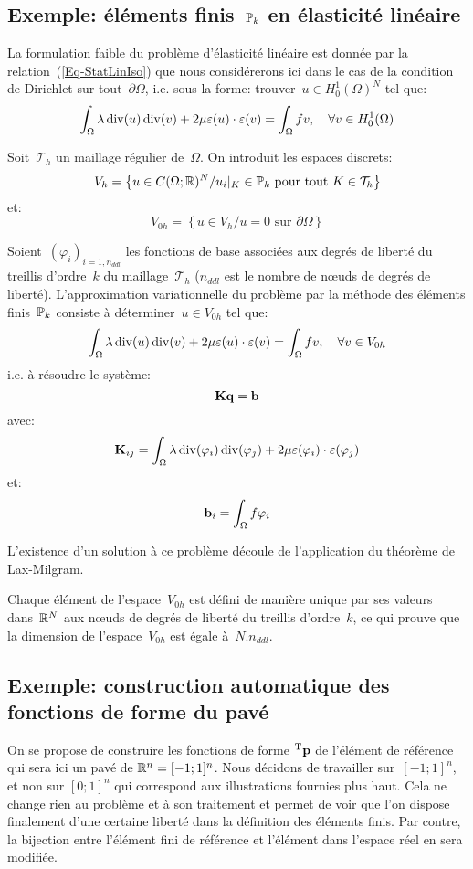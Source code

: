 \medskip
\subsection{Exemple: éléments finis~$\mathbb P_k$ en élasticité linéaire}

La formulation faible du problème d'élasticité linéaire est donnée par la relation~(\ref{Eq-StatLinIso}) que nous considérerons ici dans le cas de la condition de Dirichlet sur tout~$\partial\Omega$, i.e. sous la forme: trouver~$u\in H^1_0(\Omega)^N$ tel que:
\[
\displaystyle\int_\Omega \lambda \operatorname{div}(u)\operatorname{div}(v)+2\mu\varepsilon(u)\cdot\varepsilon(v) = \displaystyle\int_\Omega fv, \quad \forall v\in H^1_0(\Omega)
\]

Soit~$\mathcal{T}_h$ un maillage régulier de~$\Omega$. On introduit les espaces discrets:
\[ V_h=\left\{ u\in C(\Omega;\mathbb R)^N/ u_i|_K\in\mathbb P_k \text{ pour tout }K\in\mathcal{T}_h \right\} \]
et:
\[ V_{0h} = \left\{ u\in V_h/ u=0 \text{ sur }\partial\Omega\right\} \]

Soient~$(\varphi_i)_{i=1,n_{ddl}}$ les fonctions de base associées aux degrés de liberté du treillis d'ordre~$k$ du maillage~$\mathcal{T}_h$ ($n_{ddl}$ est le nombre de nœuds de degrés de liberté). L'approximation variationnelle du problème par la méthode des éléments finis~$\mathbb P_k$ consiste à déterminer~$u\in V_{0h}$ tel que:
\[
\displaystyle\int_\Omega \lambda \operatorname{div}(u)\operatorname{div}(v)+2\mu\varepsilon(u)\cdot\varepsilon(v) = \displaystyle\int_\Omega fv, \quad \forall v\in V_{0h}
\]
i.e. à résoudre le système:
\[ \MM{K}\VV{q}=\VV{b} \]
avec:
\[ \MM{K}_{ij} = \dint_\Omega \lambda \dive(\varphi_i)\dive(\varphi_j)+2\mu\varepsilon(\varphi_i)\cdot\varepsilon(\varphi_j) \]
et:
\[ \VV{b}_i = \dint_\Omega f\varphi_i \]

L'existence d'un solution à ce problème découle de l'application du théorème de Lax-Milgram.

Chaque élément de l'espace~$V_{0h}$ est défini de manière unique par ses valeurs dans~$\mathbb R^N$ aux nœuds de degrés de liberté du treillis d'ordre~$k$, ce qui prouve que la dimension de l'espace~$V_{0h}$ est égale à~$N.n_{ddl}$.

\medskip
\subsection{Exemple: construction automatique des fonctions de forme du pavé}

On se propose de construire les fonctions de forme ${}^\mathrm{T}\mathbf{p}$ de l'élément de référence qui sera ici un pavé de $\mathbb R^n=[-1;1]^n$.
Nous décidons de travailler sur~$[-1;1]^n$, et non sur $[0;1]^n$ qui correspond aux illustrations fournies plus haut. Cela ne change rien au problème et à son traitement et permet de voir que l'on dispose finalement d'une certaine liberté dans la définition des éléments finis. Par contre, la bijection entre l'élément fini de référence et l'élément dans l'espace réel en sera modifiée.

